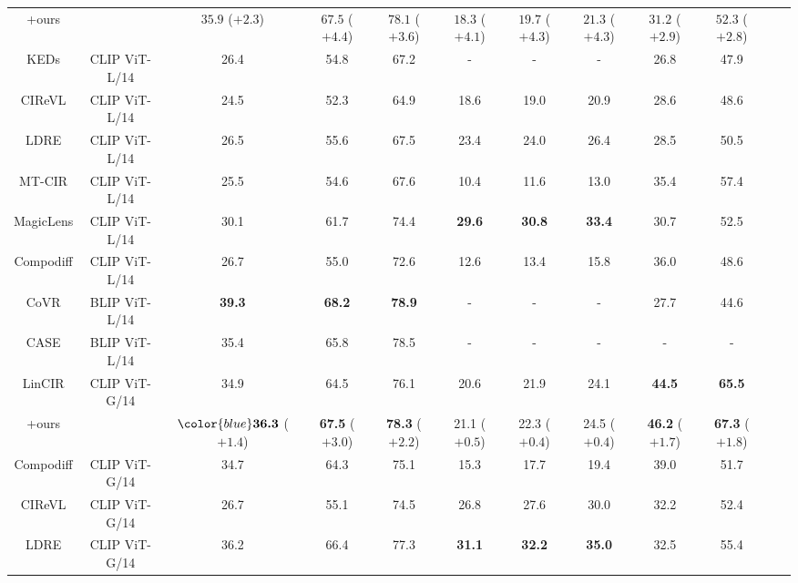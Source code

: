 {\begin{tabular}{c|ccccccccccc}
    \rowcolor{gray!20} +ours &  & $35.9$ \color{violet}($\mathbf{+2.3}$) & \color{blue} $\mathbf{67.5}$ \color{violet}($\mathbf{+4.4}$) & $78.1$ \color{violet}($\mathbf{+3.6}$) & $18.3$ \color{violet}($\mathbf{+4.1}$) & $19.7$ \color{violet}($\mathbf{+4.3}$) & $21.3$ \color{violet}($\mathbf{+4.3}$)   & $31.2$ \color{violet}($\mathbf{+2.9}$) & $52.3$ \color{violet}($\mathbf{+2.8}$)   \\
     KEDs \citep{KEDs} & CLIP ViT-L/14  & 26.4 & 54.8 & 67.2 & - & - & - & 26.8 & 47.9  \\
     CIReVL \citep{cirevl}  & CLIP ViT-L/14  & 24.5 & 52.3 & 64.9 &18.6 &19.0 & 20.9  & 28.6 & 48.6  \\
    LDRE \citep{ldre}  & CLIP ViT-L/14  & 26.5 & 55.6 & 67.5 &23.4 &24.0 & 26.4  & 28.5 & 50.5  \\
    MT-CIR \citep{mtcir} & CLIP ViT-L/14  & 25.5 & 54.6 & 67.6 & 10.4 & 11.6 & 13.0  & 35.4 & 57.4  \\
    MagicLens \citep{magiclens} & CLIP ViT-L/14   & 30.1 & 61.7 & 74.4 & \color{blue} \textbf{29.6} & \color{blue} \textbf{30.8} & \color{blue} \textbf{33.4}  & 30.7 & 52.5  \\
    Compodiff \citep{compodiff} & CLIP ViT-L/14   & 26.7 & 55.0 & 72.6 & 12.6 &13.4 & 15.8  & 36.0 & 48.6  \\
    CoVR \citep{covr} & BLIP ViT-L/14  & \color{red} \textbf{39.3} & \color{red} \textbf{68.2} & \color{red} \textbf{78.9} & - & - & - & 27.7 & 44.6  \\
    CASE \citep{(CASE)levy2024data} & BLIP ViT-L/14  & 35.4 & 65.8 & 78.5 & - & - & - & - & -  \\
        \midrule
    LinCIR \citep{lincir}  & CLIP ViT-G/14  & 34.9 & 64.5 & 76.1 & 20.6 &21.9 & 24.1  & \color{blue}\textbf{44.5} & \color{red}\textbf{65.5}  \\
     \rowcolor{gray!20} +ours  &  & $\color{blue} \textbf{36.3}$ \color{violet}($\mathbf{+1.4}$) & \color{blue} \textbf{67.5} \color{violet}($\mathbf{+3.0}$)  & \color{blue} \textbf{78.3} \color{violet}($\mathbf{+2.2}$) & 21.1 \color{violet}($\mathbf{+0.5}$) &22.3 \color{violet}($\mathbf{+0.4}$) & 24.5 \color{violet}($\mathbf{+0.4}$)  & \color{red}\textbf{46.2} \color{violet}($\mathbf{+1.7}$) & \color{red}\textbf{67.3} \color{violet}($\mathbf{+1.8}$)  \\
     Compodiff \citep{cirevl}  & CLIP ViT-G/14  & 34.7 & 64.3 & 75.1 & 15.3 &17.7 & 19.4 & 39.0 & 51.7  \\
     CIReVL \citep{cirevl}  & CLIP ViT-G/14  & 26.7 & 55.1 & 74.5 & 26.8 &27.6 & 30.0  & 32.2 & 52.4  \\
     LDRE \citep{ldre}  & CLIP ViT-G/14  & 36.2 & 66.4 & 77.3 & \color{red} \textbf{31.1} & \color{red}  \textbf{32.2} &\color{red}  \textbf{35.0}  & 32.5 & 55.4  \\
    \bottomrule
\end{tabular}
    }
